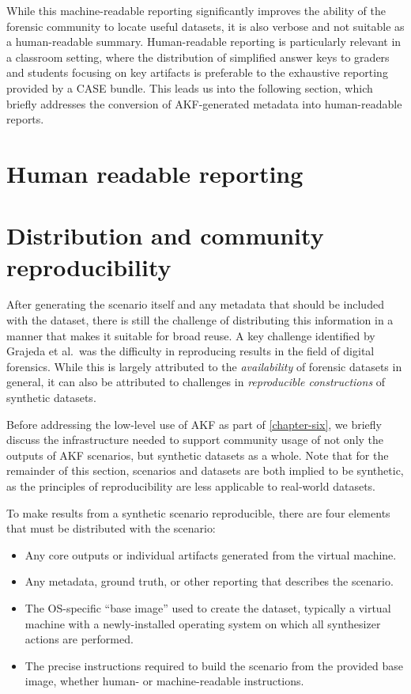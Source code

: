 While this machine-readable reporting significantly improves the ability
of the forensic community to locate useful datasets, it is also verbose
and not suitable as a human-readable summary. Human-readable reporting
is particularly relevant in a classroom setting, where the distribution
of simplified answer keys to graders and students focusing on key
artifacts is preferable to the exhaustive reporting provided by a CASE
bundle. This leads us into the following section, which briefly
addresses the conversion of AKF-generated metadata into human-readable
reports.

\section{Human readable reporting}\label{human-readable-reporting}

\section{Distribution and community
reproducibility}\label{distribution-and-community-reproducibility}

After generating the scenario itself and any metadata that should be
included with the dataset, there is still the challenge of distributing
this information in a manner that makes it suitable for broad reuse. A
key challenge identified by Grajeda et al.~was the difficulty in
reproducing results in the field of digital forensics. While this is
largely attributed to the \emph{availability} of forensic datasets in
general, it can also be attributed to challenges in \emph{reproducible
constructions} of synthetic datasets.

Before addressing the low-level use of AKF as part of \autoref{chapter-six}, we briefly discuss the infrastructure needed to
support community usage of not only the outputs of AKF scenarios, but
synthetic datasets as a whole. Note that for the remainder of this
section, scenarios and datasets are both implied to be synthetic, as the
principles of reproducibility are less applicable to real-world
datasets.

To make results from a synthetic scenario reproducible, there are four
elements that must be distributed with the scenario:

\begin{itemize}
\tightlist
\item
  Any core outputs or individual artifacts generated from the virtual
  machine.
\item
  Any metadata, ground truth, or other reporting that describes the
  scenario.
\item
  The OS-specific ``base image'' used to create the dataset, typically a
  virtual machine with a newly-installed operating system on which all
  synthesizer actions are performed.
\item
  The precise instructions required to build the scenario from the
  provided base image, whether human- or machine-readable instructions.
\end{itemize}

